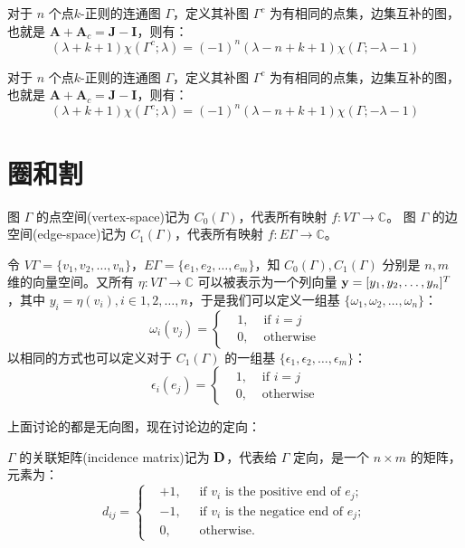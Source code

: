 \begin{proposition}
对于 $n$ 个点$k$-正则的连通图 $\Gamma$，定义其补图 $\Gamma^c$ 为有相同的点集，边集互补的图，也就是 $\mathbf A + \mathbf A_c = \mathbf J - \mathbf I$，则有：
\[
(\lambda + k + 1) \chi (\Gamma^c; \lambda) = (-1)^n (\lambda - n + k + 1) \chi (\Gamma; -\lambda - 1)
\]
\end{proposition}

\begin{proposition}
对于 $n$ 个点$k$-正则的连通图 $\Gamma$，定义其补图 $\Gamma^c$ 为有相同的点集，边集互补的图，也就是 $\mathbf A + \mathbf A_c = \mathbf J - \mathbf I$，则有：
\[
(\lambda + k + 1) \chi (\Gamma^c; \lambda) = (-1)^n (\lambda - n + k + 1) \chi (\Gamma; -\lambda - 1)
\]
\end{proposition}


\section{圈和割}

\begin{definition}[点空间与边空间]
图 $\Gamma$ 的点空间(vertex-space)记为 $C_0(\Gamma)$，代表所有映射 $f: V\Gamma \to \mathbb C$。
图 $\Gamma$ 的边空间(edge-space)记为 $C_1(\Gamma)$，代表所有映射 $f: E\Gamma \to \mathbb C$。
\end{definition}

令 $V\Gamma = \{v_1, v_2, \dots, v_n\}$，$E\Gamma = \{e_1, e_2, \dots, e_m\}$，知 $C_0(\Gamma),C_1(\Gamma)$ 分别是 $n,m$ 维的向量空间。又所有 $\eta: V\Gamma \to \mathbb C$ 可以被表示为一个列向量 $\textbf y = [y_1, y_2, \dots, y_n]^T$，其中 $y_i = \eta(v_i), i\in {1,2,\dots,n}$，于是我们可以定义一组基 $\{\omega_1, \omega_2, \dots, \omega_n\}$：
\[
\omega_i(v_j) = \left\{\begin{aligned} 
&1, &\text{ if } i=j \\  
&0, &\text{ otherwise}
\end{aligned}\right.
\]
以相同的方式也可以定义对于 $C_1(\Gamma)$ 的一组基 $\{\epsilon _1, \epsilon_2, \dots, \epsilon_m\}$：
\[
\epsilon_i(e_j) = \left\{\begin{aligned} 
&1, &\text{ if } i=j \\  
&0, &\text{ otherwise}
\end{aligned}\right.
\]

上面讨论的都是无向图，现在讨论边的定向：

\begin{definition}[关联矩阵]
$\Gamma$ 的关联矩阵(incidence matrix)记为 $\textbf D$，代表给 $\Gamma$ 定向，是一个 $n\times m$ 的矩阵，元素为：
\[
d_{ij} = \left\{\begin{aligned} 
&+1, &\; \text{ if } v_i \text{ is the positive end of } e_j; \\  
&-1, &\; \text{ if } v_i \text{ is the negatice end of } e_j; \\  
&0 , &\; \text{ otherwise.}
\end{aligned}\right.
\]
\end{definition}


